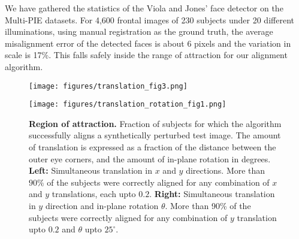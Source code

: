 \documentclass[10pt,twocolumn,letterpaper]{article}
\begin{document}
\begin{enumerate}
We have gathered the statistics of the Viola and Jones' face detector on the Multi-PIE datasets. For 4,600 frontal images of 230 subjects under 20 different illuminations, using manual registration as the ground truth, the average misalignment error of the detected faces is about 6 pixels and the variation in scale is 17\%. This falls safely inside the range of attraction for our alignment algorithm.
\begin{figure}[t]
\begin{minipage}{1.5in}
\texttt{[image: figures/translation\_fig3.png]}
\end{minipage}\hspace{3mm}
\begin{minipage}{1.5in}
\texttt{[image: figures/translation\_rotation\_fig1.png]}
\end{minipage}
\vspace{.1in}
\caption{{\bf Region of attraction.} Fraction of subjects for which the algorithm successfully aligns a synthetically perturbed test image.  The amount of translation is expressed as a fraction of the distance between the outer eye corners, and the amount of in-plane rotation in degrees. {\bf Left:} Simultaneous translation in $x$ and $y$ directions. More than $90\%$ of the subjects were correctly aligned for any combination of $x$ and $y$ translations, each upto $0.2$. {\bf Right:} Simultaneous translation in $y$ direction and in-plane rotation $\theta$. More than 90\% of the subjects were correctly aligned for any combination of $y$ translation upto $0.2$ and $\theta$ upto $25^\circ$.}
\label{fig:attraction}
\end{figure}


\end{enumerate}
\end{document}
